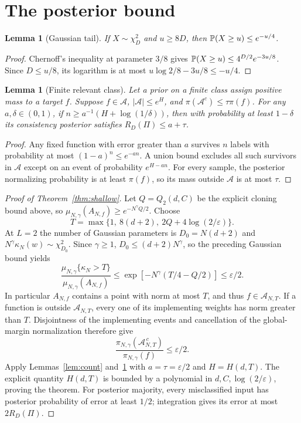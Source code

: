 \documentclass[11pt]{article}
\newtheorem{lemma}[theorem]{Lemma}
\theoremstyle{remark}\newtheorem{remark}[theorem]{Remark}
\begin{document}
\section{The posterior bound}
\begin{lemma}[Gaussian tail]
If $X\sim\chi^2_D$ and $u\geq8D$, then $\mathbb P(X\geq u)\leq e^{-u/4}$.
\end{lemma}
\begin{proof}
Chernoff's inequality at parameter $3/8$ gives
$\mathbb P(X\geq u)\leq4^{D/2}e^{-3u/8}$.
Since $D\leq u/8$, its logarithm is at most
$u\log2/8-3u/8\leq-u/4$.
\end{proof}
\begin{lemma}[Finite relevant class]\label{lem:relevant}
Let a prior on a finite class assign positive mass to a target $f$. Suppose
$f\in\mathcal A$, $|\mathcal A|\leq e^H$, and
$\pi(\mathcal A^c)\leq\tau\pi(f)$.
For any $a,\delta\in(0,1)$, if
$n\geq a^{-1}(H+\log(1/\delta))$, then with probability at least
$1-\delta$ its consistency posterior satisfies $R_D(\Pi)\leq a+\tau$.
\end{lemma}
\begin{proof}
Any fixed function with error greater than $a$ survives $n$ labels with
probability at most $(1-a)^n\leq e^{-an}$. A union bound excludes all such
survivors in $\mathcal A$ except on an event of probability $e^{H-an}$.
For every sample, the posterior normalizing probability is at least
$\pi(f)$, so its mass outside $\mathcal A$ is at most $\tau$.
\end{proof}
\begin{proof}[Proof of Theorem~\ref{thm:shallow}]
Let $Q=Q_2(d,C)$ be the explicit cloning bound above, so
$\mu_{N,\gamma}(A_{N,f})\geq e^{-N^\gamma Q/2}$.
Choose
\[
 T=\max\{1,\ 8(d+2),\ 2Q+4\log(2/\varepsilon)\}.
\]
At $L=2$ the number of Gaussian parameters is $D_0=N(d+2)$ and
$N^\gamma\kappa_N(w)\sim\chi^2_{D_0}$.
Since $\gamma\geq1$, $D_0\leq(d+2)N^\gamma$, so the preceding Gaussian
bound yields
\[
 \frac{\mu_{N,\gamma}\{\kappa_N>T\}}
      {\mu_{N,\gamma}(A_{N,f})}
 \leq\exp[-N^\gamma(T/4-Q/2)]\leq\varepsilon/2.
\]
In particular $A_{N,f}$ contains a point with norm at most $T$, and thus
$f\in\mathcal A_{N,T}$. If a function is outside $\mathcal A_{N,T}$, every
one of its implementing weights has norm greater than $T$. Disjointness of
the implementing events and cancellation of the global-margin normalization
therefore give
\[
 \frac{\pi_{N,\gamma}(\mathcal A_{N,T}^{\,c})}{\pi_{N,\gamma}(f)}
 \leq\varepsilon/2.
\]
Apply Lemmas~\ref{lem:count} and~\ref{lem:relevant} with
$a=\tau=\varepsilon/2$ and $H=H(d,T)$.
The explicit quantity $H(d,T)$ is bounded by a polynomial in
$d,C,\log(2/\varepsilon)$, proving the theorem.
For posterior majority, every misclassified input has posterior probability
of error at least $1/2$; integration gives its error at most $2R_D(\Pi)$.
\end{proof}
\end{document}
